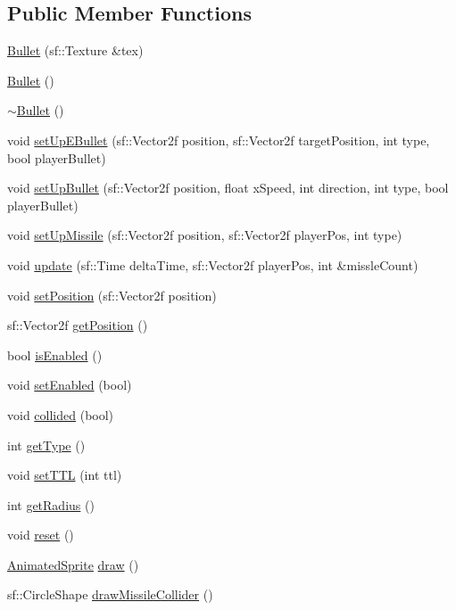 \subsection*{Public Member Functions}
\begin{DoxyCompactItemize}
\item 
\hyperlink{class_bullet_aa63b471d62d662e9015d18c7c7972db0}{Bullet} (sf\+::\+Texture \&tex)
\item 
\hyperlink{class_bullet_acd7befc0bc18907cc1d871d37bbdddeb}{Bullet} ()
\item 
\hyperlink{class_bullet_aaeb5cb41d7db89f49007b08b41f1bfcf}{$\sim$\+Bullet} ()
\item 
void \hyperlink{class_bullet_afa7788ce043c909b96c37a0265755000}{set\+Up\+E\+Bullet} (sf\+::\+Vector2f position, sf\+::\+Vector2f target\+Position, int type, bool player\+Bullet)
\item 
void \hyperlink{class_bullet_a2ac1e1ac43af3bbd0d7c2a72e0e17e51}{set\+Up\+Bullet} (sf\+::\+Vector2f position, float x\+Speed, int direction, int type, bool player\+Bullet)
\item 
void \hyperlink{class_bullet_a5ee57e44e79f829920f4c117937d5f97}{set\+Up\+Missile} (sf\+::\+Vector2f position, sf\+::\+Vector2f player\+Pos, int type)
\item 
void \hyperlink{class_bullet_ac1793d563983d2503cc562e0b3e1eee7}{update} (sf\+::\+Time delta\+Time, sf\+::\+Vector2f player\+Pos, int \&missle\+Count)
\item 
void \hyperlink{class_bullet_a143a06245534960d6af5ffb10b101750}{set\+Position} (sf\+::\+Vector2f position)
\item 
sf\+::\+Vector2f \hyperlink{class_bullet_a64e4ce634f62ab31d338bd142c1987c9}{get\+Position} ()
\item 
bool \hyperlink{class_bullet_a459d9d3adb6bdd2899965e1916eafb49}{is\+Enabled} ()
\item 
void \hyperlink{class_bullet_a31f36da7eb69fdf357670f2ac7bbae85}{set\+Enabled} (bool)
\item 
void \hyperlink{class_bullet_a49da1f5862bcb89f36588ead6e620c06}{collided} (bool)
\item 
int \hyperlink{class_bullet_a73634149134359bca3f2201fb6284707}{get\+Type} ()
\item 
void \hyperlink{class_bullet_abbf2bd440aade1c9f0f8f61d333ca64a}{set\+T\+TL} (int ttl)
\item 
int \hyperlink{class_bullet_a781ca8ccaf366435ece65eacd79e8b44}{get\+Radius} ()
\item 
void \hyperlink{class_bullet_af2e8a6860232266f180efbdb2a68f8c9}{reset} ()
\item 
\hyperlink{class_animated_sprite}{Animated\+Sprite} \hyperlink{class_bullet_abd80643d0485e32232ad46cc2087de40}{draw} ()
\item 
sf\+::\+Circle\+Shape \hyperlink{class_bullet_ac8c9c18e09ff7ef97313aa0c805c9846}{draw\+Missile\+Collider} ()
\end{DoxyCompactItemize}


